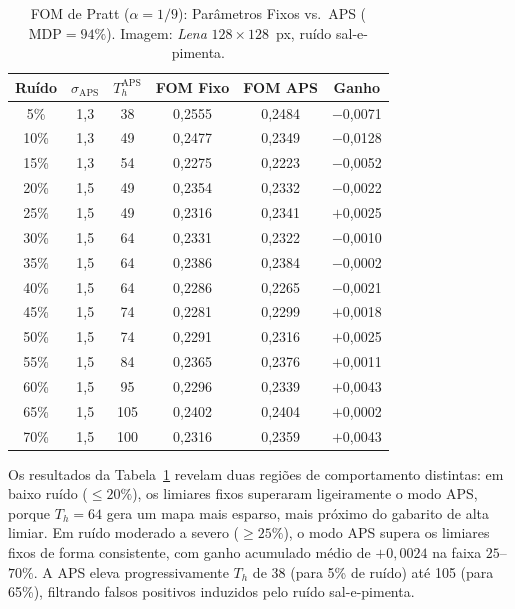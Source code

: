 \begin{table}[htbp]
    \centering
    \caption{FOM de Pratt ($\alpha=1/9$): Parâmetros Fixos vs.\ APS ($\mathrm{MDP}=94\%$).
             Imagem: \textit{Lena} $128\times128$~px, ruído sal-e-pimenta.}
    \label{tab:fom_resultados}
    \renewcommand{\arraystretch}{1.12}
    \setlength{\tabcolsep}{6pt}
    \begin{tabular}{cccccc}
        \toprule
        \textbf{Ruído} & \textbf{$\sigma_\mathrm{APS}$} & \textbf{$T_h^\mathrm{APS}$}
            & \textbf{FOM Fixo} & \textbf{FOM APS} & \textbf{Ganho} \\
        \midrule
         5\% & 1{,}3 &  38 & 0{,}2555 & 0{,}2484 & $-$0{,}0071 \\
        10\% & 1{,}3 &  49 & 0{,}2477 & 0{,}2349 & $-$0{,}0128 \\
        15\% & 1{,}3 &  54 & 0{,}2275 & 0{,}2223 & $-$0{,}0052 \\
        20\% & 1{,}5 &  49 & 0{,}2354 & 0{,}2332 & $-$0{,}0022 \\
        25\% & 1{,}5 &  49 & 0{,}2316 & 0{,}2341 & $+$0{,}0025 \\
        30\% & 1{,}5 &  64 & 0{,}2331 & 0{,}2322 & $-$0{,}0010 \\
        35\% & 1{,}5 &  64 & 0{,}2386 & 0{,}2384 & $-$0{,}0002 \\
        40\% & 1{,}5 &  64 & 0{,}2286 & 0{,}2265 & $-$0{,}0021 \\
        45\% & 1{,}5 &  74 & 0{,}2281 & 0{,}2299 & $+$0{,}0018 \\
        50\% & 1{,}5 &  74 & 0{,}2291 & 0{,}2316 & $+$0{,}0025 \\
        55\% & 1{,}5 &  84 & 0{,}2365 & 0{,}2376 & $+$0{,}0011 \\
        60\% & 1{,}5 &  95 & 0{,}2296 & 0{,}2339 & $+$0{,}0043 \\
        65\% & 1{,}5 & 105 & 0{,}2402 & 0{,}2404 & $+$0{,}0002 \\
        70\% & 1{,}5 & 100 & 0{,}2316 & 0{,}2359 & $+$0{,}0043 \\
        \bottomrule
    \end{tabular}
\end{table}

Os resultados da Tabela~\ref{tab:fom_resultados} revelam duas regiões de comportamento
distintas: em baixo ruído ($\leq 20\%$), os limiares fixos superaram ligeiramente o modo
APS, porque $T_h=64$ gera um mapa mais esparso, mais próximo do gabarito de alta limiar.
Em ruído moderado a severo ($\geq 25\%$), o modo APS supera os limiares fixos de forma
consistente, com ganho acumulado médio de $+0{,}0024$ na faixa $25$--$70\%$. A APS eleva
progressivamente $T_h$ de 38 (para 5\% de ruído) até 105 (para 65\%), filtrando falsos
positivos induzidos pelo ruído sal-e-pimenta.

